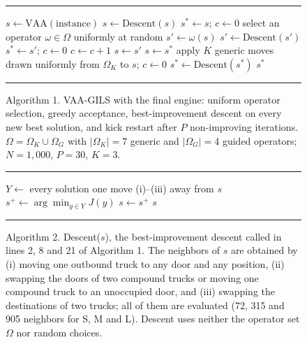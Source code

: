 \documentclass[10pt,a4paper]{article}
\begin{document}
\begin{figure}[H]\centering
\begin{minipage}{0.92\columnwidth}
\rule{\linewidth}{0.8pt}
\begin{algorithmic}[1]
\small
\State $s \gets \mathrm{VAA}(\text{instance})$ 
\State $s \gets \mathrm{Descent}(s)$
\State $s^{*} \gets s$; $c \gets 0$ 
  \State select an operator $\omega \in \Omega$ uniformly at random
  \State $s' \gets \omega(s)$ 
   
    \State $s' \gets \mathrm{Descent}(s')$
    \State $s^{*} \gets s'$; $c \gets 0$
  \Else
    \State $c \gets c + 1$
  \EndIf
   
    \State $s \gets s'$
  \EndIf
   
    \State $s \gets s^{*}$
    \State apply $K$ generic moves drawn uniformly from $\Omega_{K}$ to $s$; $c \gets 0$
  \EndIf
\EndFor
\State $s^{*} \gets \mathrm{Descent}(s^{*})$
\State \Return $s^{*}$
\end{algorithmic}
\rule{\linewidth}{0.8pt}
\end{minipage}
\caption*{Algorithm 1. VAA-GILS with the final engine: uniform operator selection, greedy acceptance, best-improvement descent on every new best solution, and kick restart after $P$ non-improving iterations. $\Omega = \Omega_{K} \cup \Omega_{G}$ with $|\Omega_{K}| = 7$ generic and $|\Omega_{G}| = 4$ guided operators; $N = 1{,}000$, $P = 30$, $K = 3$.}\label{alg:gils}
\end{figure}

\begin{figure}[H]\centering
\begin{minipage}{0.92\columnwidth}
\rule{\linewidth}{0.8pt}
\begin{algorithmic}[1]
\small
{}
  \Loop
    \State $Y \gets$ every solution one move (i)--(iii) away from $s$ 
    \State $s^{+} \gets \arg\min_{y\in Y} J(y)$ 
      \State $s \gets s^{+}$
    \Else
      \State \Return $s$ 
    \EndIf
  \EndLoop
\EndProcedure
\end{algorithmic}
\rule{\linewidth}{0.8pt}
\end{minipage}
\caption*{Algorithm 2. Descent($s$), the best-improvement descent called in lines 2, 8 and 21 of Algorithm 1. The neighbors of $s$ are obtained by (i) moving one outbound truck to any door and any position, (ii) swapping the doors of two compound trucks or moving one compound truck to an unoccupied door, and (iii) swapping the destinations of two trucks; all of them are evaluated (72, 315 and 905 neighbors for S, M and L). Descent uses neither the operator set $\Omega$ nor random choices.}
\end{figure}
\end{document}
